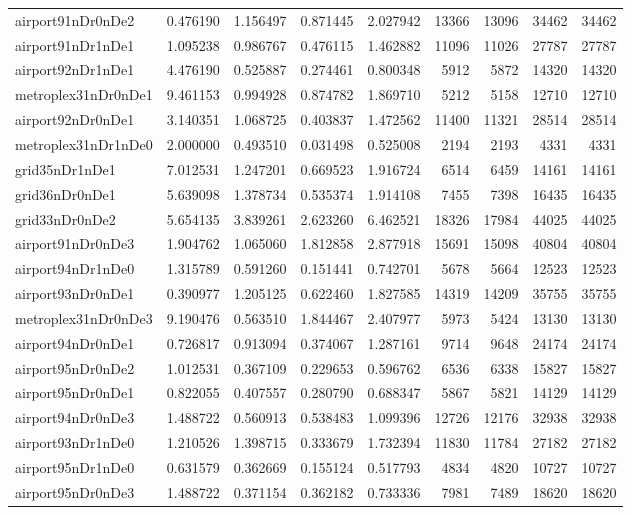 \begin{longtable}{|l|r|r|r|r|r|r|r|r|}
airport91nDr0nDe2 & 0.476190 & 1.156497 & 0.871445 & 2.027942 & 13366 & 13096 & 34462 & 34462 \\
airport91nDr1nDe1 & 1.095238 & 0.986767 & 0.476115 & 1.462882 & 11096 & 11026 & 27787 & 27787 \\
airport92nDr1nDe1 & 4.476190 & 0.525887 & 0.274461 & 0.800348 & 5912 & 5872 & 14320 & 14320 \\
metroplex31nDr0nDe1 & 9.461153 & 0.994928 & 0.874782 & 1.869710 & 5212 & 5158 & 12710 & 12710 \\
airport92nDr0nDe1 & 3.140351 & 1.068725 & 0.403837 & 1.472562 & 11400 & 11321 & 28514 & 28514 \\
metroplex31nDr1nDe0 & 2.000000 & 0.493510 & 0.031498 & 0.525008 & 2194 & 2193 & 4331 & 4331 \\
grid35nDr1nDe1 & 7.012531 & 1.247201 & 0.669523 & 1.916724 & 6514 & 6459 & 14161 & 14161 \\
grid36nDr0nDe1 & 5.639098 & 1.378734 & 0.535374 & 1.914108 & 7455 & 7398 & 16435 & 16435 \\
grid33nDr0nDe2 & 5.654135 & 3.839261 & 2.623260 & 6.462521 & 18326 & 17984 & 44025 & 44025 \\
airport91nDr0nDe3 & 1.904762 & 1.065060 & 1.812858 & 2.877918 & 15691 & 15098 & 40804 & 40804 \\
airport94nDr1nDe0 & 1.315789 & 0.591260 & 0.151441 & 0.742701 & 5678 & 5664 & 12523 & 12523 \\
airport93nDr0nDe1 & 0.390977 & 1.205125 & 0.622460 & 1.827585 & 14319 & 14209 & 35755 & 35755 \\
metroplex31nDr0nDe3 & 9.190476 & 0.563510 & 1.844467 & 2.407977 & 5973 & 5424 & 13130 & 13130 \\
airport94nDr0nDe1 & 0.726817 & 0.913094 & 0.374067 & 1.287161 & 9714 & 9648 & 24174 & 24174 \\
airport95nDr0nDe2 & 1.012531 & 0.367109 & 0.229653 & 0.596762 & 6536 & 6338 & 15827 & 15827 \\
airport95nDr0nDe1 & 0.822055 & 0.407557 & 0.280790 & 0.688347 & 5867 & 5821 & 14129 & 14129 \\
airport94nDr0nDe3 & 1.488722 & 0.560913 & 0.538483 & 1.099396 & 12726 & 12176 & 32938 & 32938 \\
airport93nDr1nDe0 & 1.210526 & 1.398715 & 0.333679 & 1.732394 & 11830 & 11784 & 27182 & 27182 \\
airport95nDr1nDe0 & 0.631579 & 0.362669 & 0.155124 & 0.517793 & 4834 & 4820 & 10727 & 10727 \\
airport95nDr0nDe3 & 1.488722 & 0.371154 & 0.362182 & 0.733336 & 7981 & 7489 & 18620 & 18620 \\

\end{longtable}
